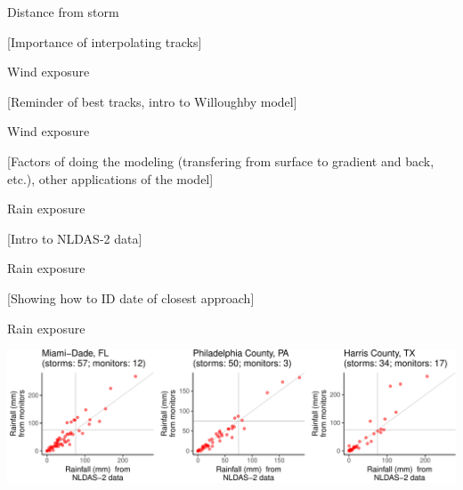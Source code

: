 \documentclass[ignorenonframetext,]{beamer}
\begin{document}
\begin{frame}{Distance from storm}

{[}Importance of interpolating tracks{]}

\end{frame}

\begin{frame}{Wind exposure}

{[}Reminder of best tracks, intro to Willoughby model{]}

\end{frame}

\begin{frame}{Wind exposure}

{[}Factors of doing the modeling (transfering from surface to gradient
and back, etc.), other applications of the model{]}

\end{frame}

\begin{frame}{Rain exposure}

{[}Intro to NLDAS-2 data{]}

\end{frame}

\begin{frame}{Rain exposure}

{[}Showing how to ID date of closest approach{]}

\end{frame}

\begin{frame}{Rain exposure}

\begin{flushleft}\includegraphics[width=1.05\textwidth]{anderson_jan11_files/figure-beamer/compare_rain_ex_counties-1} \end{flushleft}

\end{frame}
\end{document}
